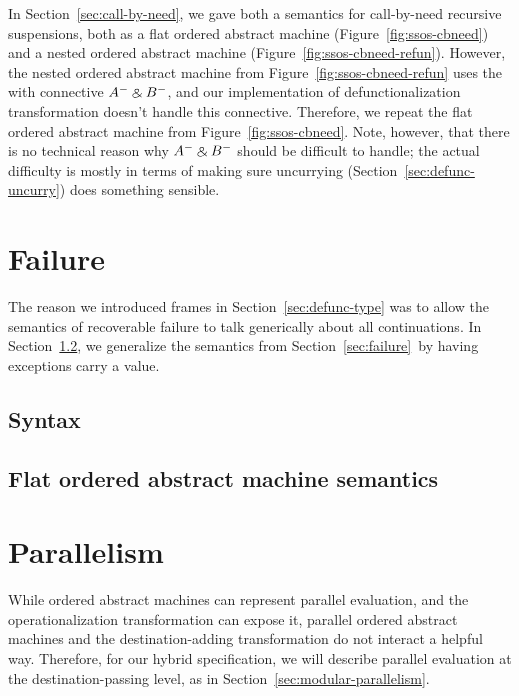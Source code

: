 In Section~\ref{sec:call-by-need}, we gave both a semantics for
call-by-need recursive suspensions, both as a flat ordered abstract
machine (Figure~\ref{fig:ssos-cbneed}) and a nested ordered abstract
machine (Figure~\ref{fig:ssos-cbneed-refun}). However, the nested
ordered abstract machine from Figure~\ref{fig:ssos-cbneed-refun} uses
the with connective $A^- \mathbin{\binampersand} B^-$, and our implementation of
defunctionalization transformation doesn't handle this connective.
Therefore, we repeat the flat ordered abstract machine from
Figure~\ref{fig:ssos-cbneed}.  Note, however, that there is no
technical reason why $A^- \mathbin{\binampersand} B^-$ should be difficult to handle;
the actual difficulty is mostly in terms of making sure uncurrying
(Section~\ref{sec:defunc-uncurry}) does something sensible.

\bigskip
{}

\section{Failure}

The reason we introduced frames in Section~\ref{sec:defunc-type} was
to allow the semantics of recoverable failure to talk generically
about all continuations. In Section~\ref{sec:compose-control}, we
generalize the semantics from Section~\ref{sec:failure}~by having exceptions
carry a value.

\subsection{Syntax}


\subsection{Flat ordered abstract machine semantics}
\label{sec:compose-control}


\section{Parallelism}

While ordered abstract machines can represent parallel evaluation, and
the operationalization transformation can expose it, parallel ordered
abstract machines and the destination-adding transformation do not
interact a helpful way. Therefore, for our hybrid specification,
we will describe parallel evaluation at the destination-passing 
level, as in Section~\ref{sec:modular-parallelism}.

